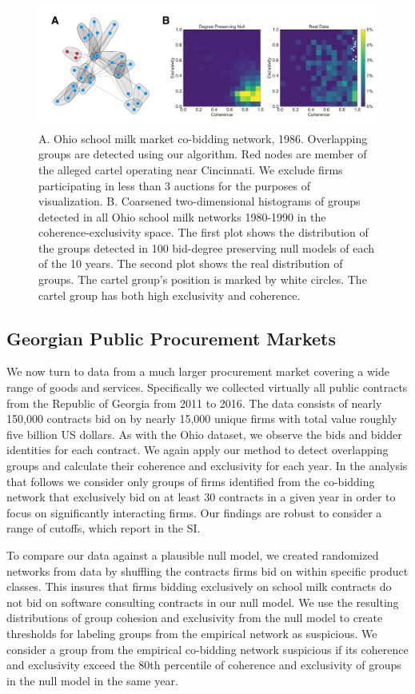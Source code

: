 \begin{figure}[t]
\centering
\includegraphics[width=\textwidth]{images/cartels/combined_ohio.pdf}
\caption[Ohio school milk cartel]{A. Ohio school milk market co-bidding network, 1986. Overlapping groups are detected using our algorithm. Red nodes are member of the alleged cartel operating near Cincinnati. We exclude firms participating in less than 3 auctions for the purposes of visualization. B. Coarsened two-dimensional histograms of groups detected in all Ohio school milk networks 1980-1990 in the coherence-exclusivity space. The first plot shows the distribution of the groups detected in 100 bid-degree preserving null models of each of the 10 years. The second plot shows the real distribution of groups. The cartel group's position is marked by white circles. The cartel group has both high exclusivity and coherence.}
\label{fig:ohio_overlap}
\end{figure}


\subsection{Georgian Public Procurement Markets}
We now turn to data from a much larger procurement market covering a wide range of goods and services. Specifically we collected virtually all public contracts from the Republic of Georgia from 2011 to 2016. The data consists of nearly 150,000 contracts bid on by nearly 15,000 unique firms with total value roughly five billion US dollars. As with the Ohio dataset, we observe the bids and bidder identities for each contract. We again apply our method to detect overlapping groups and calculate their coherence and exclusivity for each year. In the analysis that follows we consider only groups of firms identified from the co-bidding network that exclusively bid on at least 30 contracts in a given year in order to focus on significantly interacting firms. Our findings are robust to consider a range of cutoffs, which report in the SI.

To compare our data against a plausible null model, we created randomized networks from data by shuffling the contracts firms bid on within specific product classes. This insures that firms bidding exclusively on school milk contracts do not bid on software consulting contracts in our null model. We use the resulting distributions of group cohesion and exclusivity from the null model to create thresholds for labeling groups from the empirical network as suspicious. We consider a group from the empirical co-bidding network suspicious if its coherence and exclusivity exceed the 80th percentile of coherence and exclusivity of groups in the null model in the same year. 

